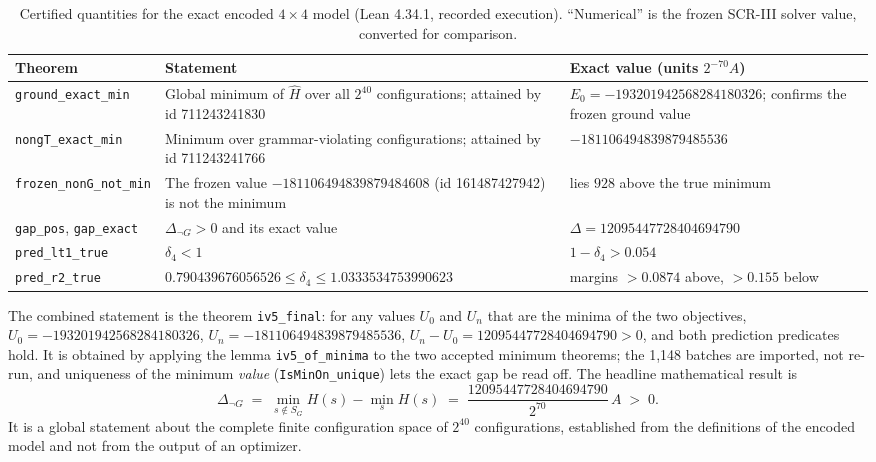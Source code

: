 \documentclass[11pt,a4paper]{article}
\theoremstyle{plain}
\theoremstyle{definition}
\theoremstyle{remark}
\newcommand{\lean}[1]{\nolinkurl{#1}}
\newcommand{\dnG}{\Delta_{\neg G}}
\begin{document}
\begin{table}[t]
\centering\small
\caption{Certified quantities for the exact encoded $4\times4$ model (Lean 4.34.1, recorded execution). ``Numerical'' is the frozen SCR-III solver value, converted for comparison.}
\label{tab:certified}
\begin{tabularx}{\linewidth}{@{}p{2.55cm}p{4.7cm}X@{}}
\toprule
Theorem & Statement & Exact value (units $2^{-70}A$)\\
\midrule
\lean{ground_exact_min} & Global minimum of $\hat H$ over all $2^{40}$ configurations; attained by id 711243241830 & $E_0=-193201942568284180326$; confirms the frozen ground value\\[0.35em]
\lean{nongT_exact_min} & Minimum over grammar-violating configurations; attained by id 711243241766 & $-181106494839879485536$\\[0.35em]
\lean{frozen_nonG_not_min} & The frozen value $-181106494839879484608$ (id 161487427942) is not the minimum & lies $928$ above the true minimum\\[0.35em]
\lean{gap_pos}, \lean{gap_exact} & $\dnG>0$ and its exact value & $\Delta=12095447728404694790$\\[0.35em]
\lean{pred_lt1_true} & $\delta_4<1$ & $1-\delta_4>0.054$\\[0.35em]
\lean{pred_r2_true} & $0.790439676056526\le\delta_4\le1.0333534753990623$ & margins $>0.0874$ above, $>0.155$ below\\
\bottomrule
\end{tabularx}
\end{table}

The combined statement is the theorem \lean{iv5_final}: for any values $U_0$ and $U_n$ that are the minima of the two objectives, $U_0=-193201942568284180326$, $U_n=-181106494839879485536$, $U_n-U_0=12095447728404694790>0$, and both prediction predicates hold. It is obtained by applying the lemma \lean{iv5_of_minima} to the two accepted minimum theorems; the 1{,}148 batches are imported, not re-run, and uniqueness of the minimum \emph{value} (\lean{IsMinOn_unique}) lets the exact gap be read off. The headline mathematical result is
\begin{equation}
\dnG\;=\;\min_{s\notin S_G}H(s)-\min_sH(s)\;=\;\frac{12095447728404694790}{2^{70}}\,A\;>\;0 .
\label{eq:gapexact}
\end{equation}
It is a global statement about the complete finite configuration space of $2^{40}$ configurations, established from the definitions of the encoded model and not from the output of an optimizer.
\end{document}
